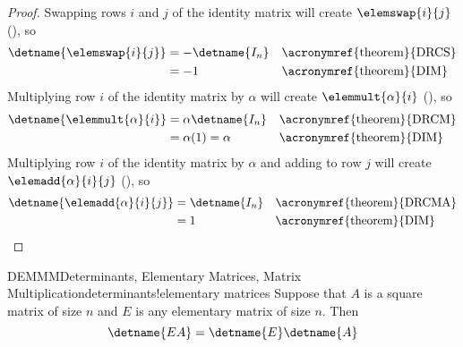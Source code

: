 %
\begin{proof}
Swapping rows $i$ and $j$ of the identity matrix will create $\elemswap{i}{j}$  (), so
%
\begin{align*}
\detname{\elemswap{i}{j}}
&=-\detname{I_n}&&\text{\acronymref{theorem}{DRCS}}\\
%
&=-1&&\text{\acronymref{theorem}{DIM}}\\
%
\end{align*}
Multiplying row $i$ of the identity matrix by $\alpha$ will create $\elemmult{\alpha}{i}$ (), so
%
\begin{align*}
\detname{\elemmult{\alpha}{i}}
&=\alpha\detname{I_n}&&\text{\acronymref{theorem}{DRCM}}\\
%
&=\alpha(1)=\alpha&&\text{\acronymref{theorem}{DIM}}\\
%
\end{align*}
Multiplying row $i$ of the identity matrix by $\alpha$ and adding to row $j$ will create $\elemadd{\alpha}{i}{j}$ (), so
%
\begin{align*}
\detname{\elemadd{\alpha}{i}{j}}
&=\detname{I_n}&&\text{\acronymref{theorem}{DRCMA}}\\
%
&=1&&\text{\acronymref{theorem}{DIM}}\\
%
\end{align*}
\end{proof}
%
%
\begin{theorem}{DEMMM}{Determinants, Elementary Matrices, Matrix Multiplication}{determinants!elementary matrices}
Suppose that $A$ is a square matrix of size $n$ and $E$ is any elementary matrix of size $n$.  Then
%
\begin{equation*}
\detname{EA}=\detname{E}\detname{A}
\end{equation*}
%
\end{theorem}
%
